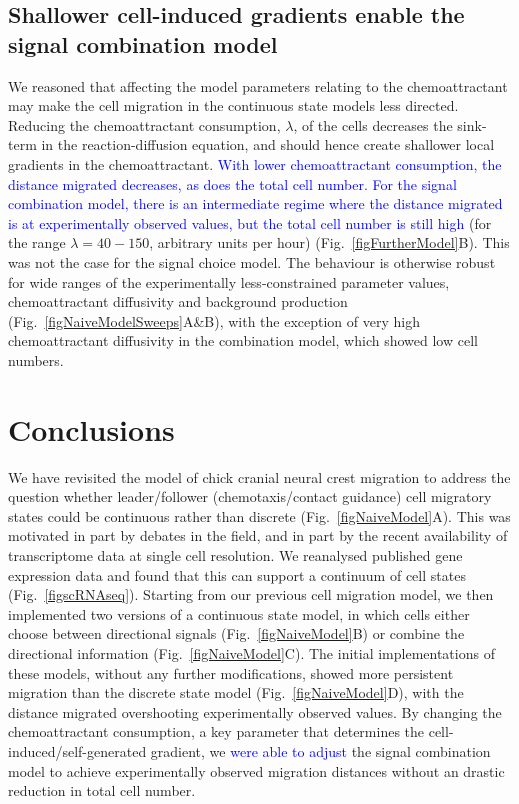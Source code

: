 \documentclass[review]{elsarticle}
\newcommand\hl[1]{{\textcolor{blue}{#1}}}
\begin{document}
\subsection{Shallower cell-induced gradients enable the signal combination model}
We reasoned that affecting the model parameters relating to the chemoattractant may make the cell migration in the continuous state models less directed. Reducing the chemoattractant consumption, $\lambda$, of the cells decreases the sink-term in the reaction-diffusion equation, and should hence create shallower local gradients in the chemoattractant. \hl{With lower chemoattractant consumption, the distance migrated decreases, as does the total cell number. For the signal combination model, there is an intermediate regime where the distance migrated is at experimentally observed values, but the total cell number is still high} (for the range $\lambda=40-150$, arbitrary units per hour) (Fig.~\ref{figFurtherModel}B). This was not the case for the signal choice model. The behaviour is otherwise robust for wide ranges of the experimentally less-constrained parameter values, chemoattractant diffusivity and background production (Fig.~\ref{figNaiveModelSweeps}A\&B), with the exception of very high chemoattractant diffusivity in the combination model, which showed low cell numbers. 

\section{Conclusions}
We have revisited the model of chick cranial neural crest migration to address the question whether leader/follower (chemotaxis/contact guidance) cell migratory states could be continuous rather than discrete (Fig.~\ref{figNaiveModel}A). This was motivated in part by debates in the field, and in part by the recent availability of transcriptome data at single cell resolution. We reanalysed published gene expression data and found that this can support a continuum of cell states (Fig.~\ref{figscRNAseq}). Starting from our previous cell migration model, we then implemented two versions of a continuous state model, in which cells either choose between directional signals (Fig.~\ref{figNaiveModel}B) or combine the directional information (Fig.~\ref{figNaiveModel}C). The initial implementations of these models, without any further modifications, showed more persistent migration than the discrete state model (Fig.~\ref{figNaiveModel}D), with the distance migrated overshooting experimentally observed values. By changing the chemoattractant consumption, a key parameter that determines the cell-induced/self-generated gradient, we \hl{were able to adjust} the signal combination model to achieve experimentally observed migration distances without an drastic reduction in total cell number.
\end{document}
